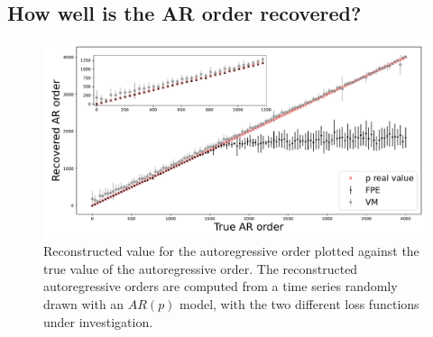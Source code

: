 \documentclass{aa}
\begin{document}
\subsection{How well is the AR order recovered?}\label{sec:arp_validation}

\begin{figure}
	\centering
	\includegraphics[width = \linewidth]{Images/Plots/ar_order2}
	\caption{Reconstructed value for the autoregressive order plotted against the true value of the autoregressive order.
	The reconstructed autoregressive orders are computed from a time series randomly drawn with an $AR(p)$ model, with the two different loss functions under investigation.
	}
	\label{fig:p_vs_ptrue}
\end{figure}
\end{document}
